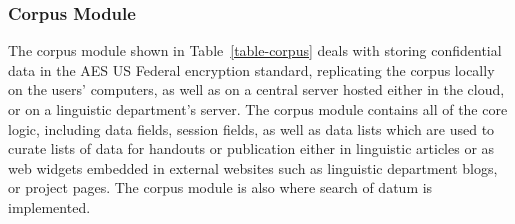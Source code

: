 \documentclass[12pt]{article}
\begin{document}
\newpage
\subsubsection{Corpus Module}
The corpus module shown in Table~\ref{table-corpus} deals with storing confidential data in the AES US Federal encryption standard, replicating the corpus locally on the  users' computers, as well as on a central server hosted either in the cloud, or on a linguistic department's server. The corpus module contains all of the core logic, including data fields, session fields, as well as data lists which are used to curate lists of data for handouts or publication either in linguistic articles or as web widgets embedded in external websites such as linguistic department blogs, or project pages. The corpus module is also where search of datum is implemented. 
\end{document}
